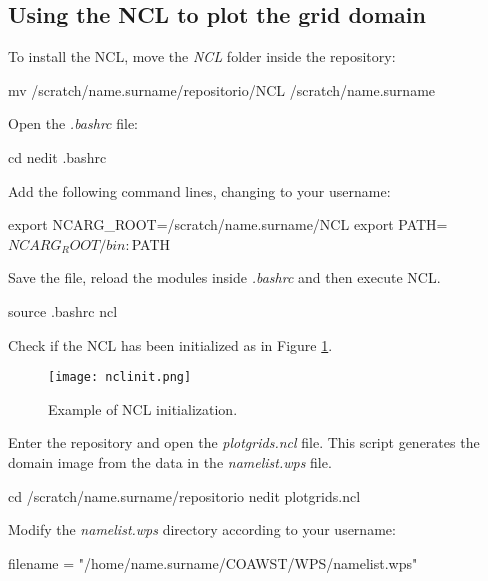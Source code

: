 \bigskip

\subsection{Using the NCL to plot the grid domain}\label{nclsec}
\bigskip

 To install the NCL, move the \textit{NCL} folder inside the repository:
\bigskip

\begin{bashcode}
mv /scratch/name.surname/repositorio/NCL /scratch/name.surname
\end{bashcode}
\bigskip

 Open the \textit{.bashrc} file:
\bigskip

\begin{bashcode}
cd
nedit .bashrc
\end{bashcode}
\bigskip

 Add the following command lines, changing to your username:
\bigskip

\begin{bashcode}
export NCARG_ROOT=/scratch/name.surname/NCL
export PATH=$NCARG_ROOT/bin:$PATH
\end{bashcode}
\bigskip

 Save the file, reload the modules inside \textit{.bashrc} and then execute NCL.
\bigskip

\begin{bashcode}
source .bashrc
ncl
\end{bashcode}
\bigskip

 Check if the NCL has been initialized as in Figure \textcolor{bleu_cite}{\ref{nclinit}}.
\bigskip

\begin{figure}[H]
    \centering
    \texttt{[image: nclinit.png]}
    \caption{Example of NCL initialization.}
    \label{nclinit}
\end{figure}
\bigskip


 Enter the repository and open the \textit{plotgrids.ncl} file. 
This script generates the domain image from the data in the \textit{namelist.wps} file.
\bigskip

\begin{bashcode}
cd /scratch/name.surname/repositorio
nedit plotgrids.ncl
\end{bashcode}
\bigskip

 Modify the \textit{namelist.wps} directory according to your username:
\bigskip

\begin{bashcode}
filename = "/home/name.surname/COAWST/WPS/namelist.wps"
\end{bashcode}
\bigskip

